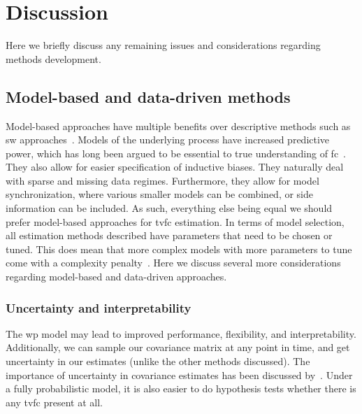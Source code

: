 \clearpage
\section{Discussion}
\label{sec:methods-discussion}

Here we briefly discuss any remaining issues and considerations regarding methods development.

\subsection{Model-based and data-driven methods}
\label{subsec:model-based-data-driven-methods}

Model-based approaches have multiple benefits over descriptive methods such as \gls{sw} approaches~\parencite{Foti2019}.
Models of the underlying process have increased predictive power, which has long been argued to be essential to true understanding of \gls{fc}~\parencite{Bassett2011}.
They also allow for easier specification of inductive biases.
They naturally deal with sparse and missing data regimes.
Furthermore, they allow for model synchronization, where various smaller models can be combined, or side information can be included.
As such, everything else being equal we should prefer model-based approaches for \gls{tvfc} estimation.
%
In terms of model selection, all estimation methods described have parameters that need to be chosen or tuned.
This does mean that more complex models with more parameters to tune come with a complexity penalty~\parencite[see also][]{Sculley2015}.
Here we discuss several more considerations regarding model-based and data-driven approaches.

\subsubsection{Uncertainty and interpretability}

The \gls{wp} model may lead to improved performance, flexibility, and interpretability.
Additionally, we can sample our covariance matrix at any point in time, and get uncertainty in our estimates (unlike the other methods discussed).
The importance of uncertainty in covariance estimates has been discussed by~\textcite{Kudela2017}.
Under a fully probabilistic model, it is also easier to do hypothesis tests whether there is any \gls{tvfc} present at all.

